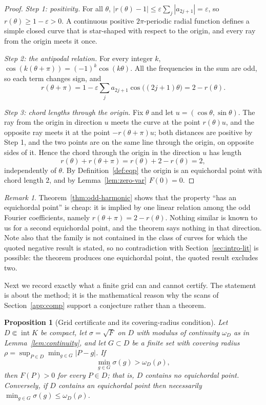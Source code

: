 \documentclass[11pt]{article}
\newtheorem{proposition}[theorem]{Proposition}
\theoremstyle{definition}
\theoremstyle{remark}
\newtheorem{remark}[theorem]{Remark}
\begin{document}
\begin{proof}
\emph{Step 1: positivity.} For all $\theta$, $|r(\theta)-1|\le\varepsilon\sum_j|a_{2j+1}|=\varepsilon$, so
$r(\theta)\ge1-\varepsilon>0$. A continuous positive $2\pi$-periodic radial function defines a simple closed curve
that is star-shaped with respect to the origin, and every ray from the origin meets it once.

\emph{Step 2: the antipodal relation.} For every integer $k$, $\cos(k(\theta+\pi))=(-1)^k\cos(k\theta)$. All the
frequencies in the sum are odd, so each term changes sign, and
\[
r(\theta+\pi)=1-\varepsilon\sum_j a_{2j+1}\cos\bigl((2j+1)\theta\bigr)=2-r(\theta).
\]

\emph{Step 3: chord lengths through the origin.} Fix $\theta$ and let $u=(\cos\theta,\sin\theta)$. The ray from the
origin in direction $u$ meets the curve at the point $r(\theta)u$, and the opposite ray meets it at the point
$-r(\theta+\pi)u$; both distances are positive by Step 1, and the two points are on the same line through the
origin, on opposite sides of it. Hence the chord through the origin in the direction $u$ has length
\[
r(\theta)+r(\theta+\pi)=r(\theta)+2-r(\theta)=2 ,
\]
independently of $\theta$. By Definition~\ref{def:eqp} the origin is an equichordal point with chord length $2$, and
by Lemma~\ref{lem:zero-var} $F(0)=0$.
\end{proof}

\begin{remark}
Theorem~\ref{thm:odd-harmonic} shows that the property ``has an equichordal point'' is cheap: it is implied by one
linear relation among the odd Fourier coefficients, namely $r(\theta+\pi)=2-r(\theta)$. Nothing similar is known
to us for a second equichordal point, and the theorem says nothing in that direction. Note also that the family is
not contained in the class of curves for which the quoted negative result is stated, so no contradiction with
Section~\ref{sec:intro-lit} is possible: the theorem produces one equichordal point, the quoted result excludes
two.
\end{remark}

Next we record exactly what a finite grid can and cannot certify. The statement is about the method; it is the
mathematical reason why the scans of Section~\ref{app:comp} support a conjecture rather than a theorem.

\begin{proposition}[Grid certificate and its covering-radius condition]\label{prop:grid-certificate}
Let $D\Subset\operatorname{int}K$ be compact, let $\sigma=\sqrt{F}$ on $D$ with modulus of continuity
$\omega_D$ as in Lemma~\ref{lem:continuity}, and let $G\subset D$ be a finite set with covering radius
$\rho=\sup_{P\in D}\min_{g\in G}|P-g|$. If
\[
\min_{g\in G}\sigma(g)>\omega_D(\rho),
\]
then $F(P)>0$ for every $P\in D$; that is, $D$ contains no equichordal point. Conversely, if $D$ contains an
equichordal point then necessarily $\min_{g\in G}\sigma(g)\le\omega_D(\rho)$.
\end{proposition}
\end{document}
